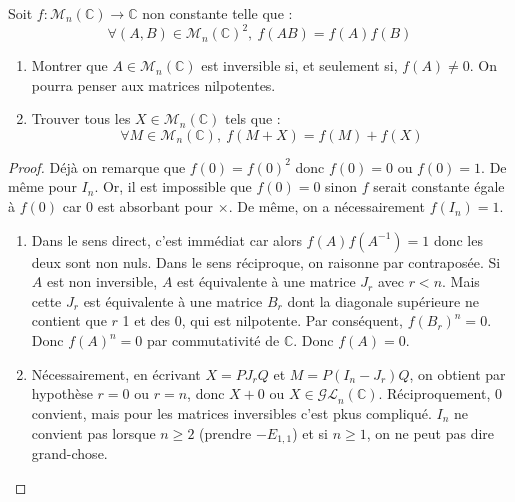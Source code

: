 \documentclass[french,a4paper]{article}
\newcommand{\C}{\mathbb{C}}
\newcommand{\inv}{^{-1}}
\theoremstyle{plain}
\theoremstyle{definition}
\theoremstyle{remark}
\begin{document}
\begin{ex}{}
	Soit $f:\mathcal{M}_n(\C)\to\C$ non constante telle que : $$\forall(A,B)\in\mathcal{M}_n(\C)^2,\ f(AB)=f(A)f(B)$$
	\begin{enumerate}
		\item Montrer que $A\in\mathcal{M}_n(\C)$ est inversible si, et seulement si, $f(A)\ne 0$. On pourra penser aux matrices nilpotentes.
		\item Trouver tous les $X\in\mathcal{M}_n(\C)$ tels que : $$\forall M\in\mathcal{M}_n(\C),\ f(M+X)=f(M)+f(X)$$
	\end{enumerate}
\end{ex}
\begin{proof}
	Déjà on remarque que $f(0)=f(0)^2$ donc $f(0)=0$ ou $f(0)=1$. De même pour $I_n$. Or, il est impossible que $f(0)=0$ sinon $f$ serait constante égale à $f(0)$ car $0$ est absorbant pour $\times$. De même, on a nécessairement $f(I_n)=1$.
	\begin{enumerate}
		\item Dans le sens direct, c'est immédiat car alors $f(A)f(A\inv)=1$ donc les deux sont non nuls. Dans le sens réciproque, on raisonne par contraposée. Si $A$ est non inversible, $A$ est équivalente à une matrice $J_r$ avec $r<n$. Mais cette $J_r$ est équivalente à une matrice $B_r$  dont la diagonale supérieure ne contient que $r$ 1 et des 0, qui est nilpotente. Par conséquent, $f(B_r)^n=0$. Donc $f(A)^n=0$ par commutativité de $\C$. Donc $f(A)=0$.
		\item Nécessairement, en écrivant $X=PJ_rQ$ et $M=P(I_n-J_r)Q$, on obtient par hypothèse $r=0$ ou $r=n$, donc $X+0$ ou $X\in\mathcal{GL}_n(\C)$. Réciproquement, $0$ convient, mais pour les matrices inversibles c'est pkus compliqué. $I_n$ ne convient pas lorsque $n\geqslant2$ (prendre $-E_{1,1}$) et si $n\geqslant 1$, on ne peut pas dire grand-chose.
	\end{enumerate}
\end{proof}
\end{document}
